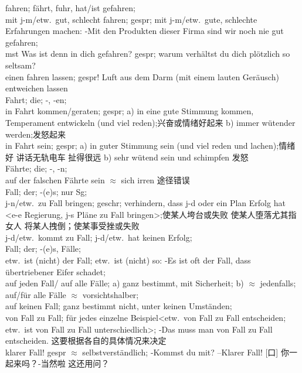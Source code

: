 \noindent
fahren; f\"ahrt, fuhr, hat/ist gefahren; \\
mit j-m/etw.\ gut, schlecht fahren; gespr; mit j-m/etw.\ gute, schlechte Erfahrungen machen: -Mit den Produkten dieser Firma sind wir noch nie gut gefahren;\\
mst Was ist denn in dich gefahren? gespr; warum verh\"altst du dich pl\"otzlich so seltsam? \\
einen fahren lassen; gespr! Luft aus dem Darm (mit einem lauten Ger\"ausch) entweichen lassen \\

\noindent
Fahrt; die; -, -en;\\
in Fahrt kommen/geraten; gespr; a) in eine gute Stimmung kommen, Temperament entwickeln (und viel reden);兴奋或情绪好起来 b) immer w\"utender werden;发怒起来\\
in Fahrt sein; gespr; a) in guter Stimmung sein (und viel reden und lachen);情绪好 讲话无轨电车 扯得很远 b) sehr w\"utend sein und schimpfen 发怒 \\

\noindent
F\"ahrte; die; -, -n;\\
auf der falschen F\"ahrte sein $\approx$ sich irren 途径错误\\ 

\noindent
Fall; der; -(e)s; nur Sg;\\
j-n/etw.\ zu Fall bringen; geschr; verhindern, dass j-d oder ein Plan Erfolg hat <e-e Regierung, j-s Pl\"ane zu Fall bringen>;使某人垮台或失败 使某人堕落尤其指女人 将某人拽倒；使某事受挫或失败\\
j-d/etw.\ kommt zu Fall; j-d/etw.\ hat keinen Erfolg;\\

\noindent
Fall; der; -(e)s, F\"alle;\\
etw.\ ist (nicht) der Fall; etw.\ ist (nicht) so: -Es ist oft der Fall, dass \"ubertriebener Eifer schadet;\\
auf jeden Fall/ auf alle F\"alle; a) ganz bestimmt, mit Sicherheit; b) $\approx$ jedenfalls;\\
auf/f\"ur alle F\"alle $\approx$ vorsichtshalber;\\
auf keinen Fall; ganz bestimmt nicht, unter keinen Umst\"anden;\\
von Fall zu Fall; f\"ur jedes einzelne Beispiel<etw.\ von Fall zu Fall entscheiden; etw.\ ist von Fall zu Fall unterschiedlich>; -Das muss man von Fall zu Fall entscheiden. 这要根据各自的具体情况来决定\\
klarer Fall! gespr $\approx$ selbstverst\"andlich; -Kommst du mit? --Klarer Fall! [口] 你一起来吗？-当然啦 这还用问？\\

